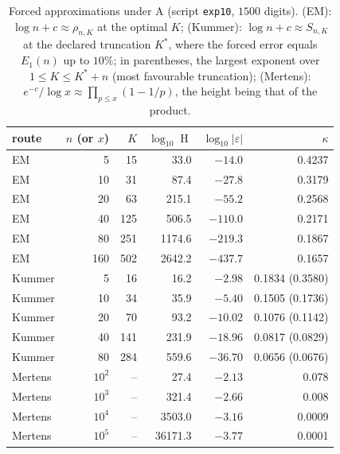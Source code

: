 \documentclass[11pt,a4paper]{article}
\DeclareMathOperator{\Ht}{H}
\theoremstyle{definition}
\theoremstyle{remark}
\numberwithin{equation}{section}
\begin{document}
\begin{table}[t]
\centering\small
\caption{Forced approximations under $\mathrm A$ (script \texttt{exp10}, $1500$ digits).
(EM): $\log n+c\approx\rho_{n,K}$ at the optimal $K$; (Kummer): $\log n+c\approx S_{n,K}$ at
the declared truncation $K^*$, where the forced error equals $E_1(n)$ up to $10\%$; in
parentheses, the largest exponent over $1\le K\le K^*+n$ (most favourable truncation);
(Mertens): $e^{-c}/\log x\approx\prod_{p\le x}(1-1/p)$, the height being that of the
product.}
\label{III:tab:forced}
\begin{tabular}{@{}lrrrrr@{}}
\toprule
route & $n$ (or $x$) & $K$ & $\log_{10}\Ht$ & $\log_{10}|\varepsilon|$ & $\kappa$\\
\midrule
EM & 5 & 15 & 33.0 & $-14.0$ & 0.4237\\
EM & 10 & 31 & 87.4 & $-27.8$ & 0.3179\\
EM & 20 & 63 & 215.1 & $-55.2$ & 0.2568\\
EM & 40 & 125 & 506.5 & $-110.0$ & 0.2171\\
EM & 80 & 251 & 1174.6 & $-219.3$ & 0.1867\\
EM & 160 & 502 & 2642.2 & $-437.7$ & 0.1657\\
\midrule
Kummer & 5 & 16 & 16.2 & $-2.98$ & 0.1834 (0.3580)\\
Kummer & 10 & 34 & 35.9 & $-5.40$ & 0.1505 (0.1736)\\
Kummer & 20 & 70 & 93.2 & $-10.02$ & 0.1076 (0.1142)\\
Kummer & 40 & 141 & 231.9 & $-18.96$ & 0.0817 (0.0829)\\
Kummer & 80 & 284 & 559.6 & $-36.70$ & 0.0656 (0.0676)\\
\midrule
Mertens & $10^2$ & -- & 27.4 & $-2.13$ & 0.078\\
Mertens & $10^3$ & -- & 321.4 & $-2.66$ & 0.008\\
Mertens & $10^4$ & -- & 3503.0 & $-3.16$ & 0.0009\\
Mertens & $10^5$ & -- & 36171.3 & $-3.77$ & 0.0001\\
\bottomrule
\end{tabular}
\end{table}
\end{document}
